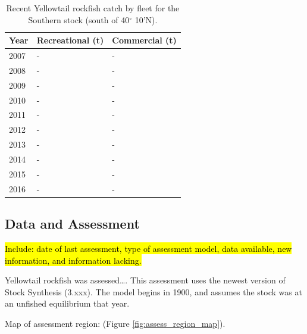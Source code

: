 \documentclass[12pt,]{article}
\begin{document}
\begin{table}[ht]
\centering
\caption{Recent Yellowtail rockfish catch by 
                                            fleet for the Southern stock 
                                             (south of 40$^\circ$ 10'N).} 
\label{tab:Exec_catch_S}
\begin{tabular}{l>{\centering}p{1.5in}>{\centering}p{1.5in}}
  \hline
Year & Recreational (t) & Commercial (t) \\ 
  \hline
2007 & - & - \\ 
  2008 & - & - \\ 
  2009 & - & - \\ 
  2010 & - & - \\ 
  2011 & - & - \\ 
  2012 & - & - \\ 
  2013 & - & - \\ 
  2014 & - & - \\ 
  2015 & - & - \\ 
  2016 & - & - \\ 
   \hline
\end{tabular}
\end{table}

\FloatBarrier

\newpage

\subsection*{Data and Assessment}\label{data-and-assessment}

\hl{Include: date of last assessment, type of assessment model, data available, new 
information, and information lacking.}

Yellowtail rockfish was assessed\ldots{}. This assessment uses the
newest version of Stock Synthesis (3.xxx). The model begins in 1900, and
assumes the stock was at an unfished equilibrium that year.

Map of assessment region: (Figure \ref{fig:assess_region_map}).
\end{document}
